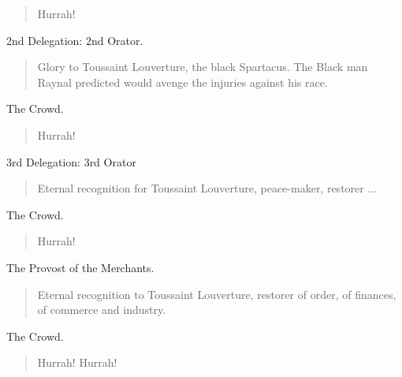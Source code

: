 \documentclass[letterpaper,article,12pt,oneside,notitlepage]{memoir}
\begin{document}
\begin{verse}
Hurrah! \\
\end{verse}

\begin{center}2nd Delegation: 2nd Orator.\end{center}

\begin{verse}
Glory to Toussaint Louverture, the black Spartacus. The Black man Raynal predicted would avenge the injuries against his race. \\
\end{verse}

\begin{center}The Crowd.\end{center}

\begin{verse}
Hurrah! \\
\end{verse}

\begin{center}3rd Delegation: 3rd Orator\end{center}

\begin{verse}
Eternal recognition for Toussaint Louverture, peace-maker, restorer ... \\
\end{verse}

\begin{center}The Crowd.\end{center}

\begin{verse}
Hurrah! \\
\end{verse}

\begin{center}The Provost of the Merchants.\end{center}

\begin{verse}
\indent Eternal recognition to Toussaint Louverture, restorer of order, of finances, of commerce and industry. \\
\end{verse}

\begin{center}The Crowd.\end{center}

\begin{verse}
Hurrah! Hurrah! \\
\end{verse}
\end{document}
